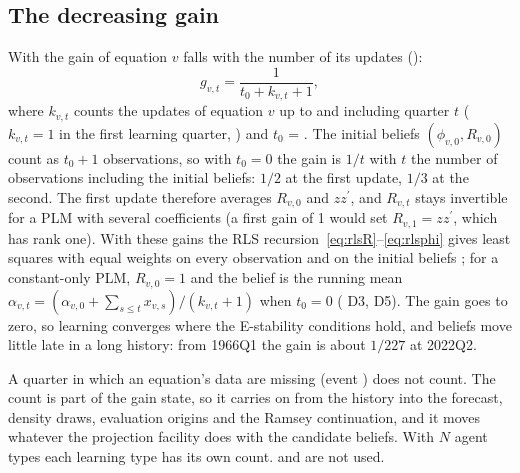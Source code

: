 \documentclass[11pt,a4paper]{article}
\newcommand{\transp}{^{\prime}}
\begin{document}
\subsection{The decreasing gain}\label{sec:decreasing}

With  the gain of equation $v$ falls with the number of its
updates ():
\begin{equation}\label{eq:decreasing}
  g_{v,t} = \frac{1}{t_0 + k_{v,t} + 1},
\end{equation}
where $k_{v,t}$ counts the updates of equation $v$ up to and including quarter $t$ ($k_{v,t} = 1$
in the first learning quarter, ) and $t_0$ = .
The initial beliefs $(\phi_{v,0}, R_{v,0})$ count as $t_0 + 1$ observations, so with $t_0 = 0$ the
gain is $1/t$ with $t$ the number of observations including the initial beliefs: $1/2$ at the
first update, $1/3$ at the second. The first update therefore averages $R_{v,0}$ and
$z z\transp$, and $R_{v,t}$ stays invertible for a PLM with several coefficients (a first gain of
1 would set $R_{v,1} = z z\transp$, which has rank one). With these gains the RLS
recursion~\eqref{eq:rlsR}--\eqref{eq:rlsphi} gives least squares with equal weights on every
observation and on the initial beliefs \citep[ch.~2]{evans2001}; for a constant-only PLM,
$R_{v,0} = 1$ and the belief is the running mean
$\alpha_{v,t} = (\alpha_{v,0} + \sum_{s \le t} x_{v,s})/(k_{v,t} + 1)$ when $t_0 = 0$
( D3, D5). The gain goes to zero, so learning converges where the
E-stability conditions hold, and beliefs move little late in a long history: from 1966Q1 the
gain is about $1/227$ at 2022Q2.

A quarter in which an equation's data are missing (event ) does not count.
The count is part of the gain state, so it carries on from the history into the forecast,
density draws, evaluation origins and the Ramsey continuation, and it moves whatever the
projection facility does with the candidate beliefs. With $N$ agent types each learning type
has its own count.  and  are not used.
\end{document}
